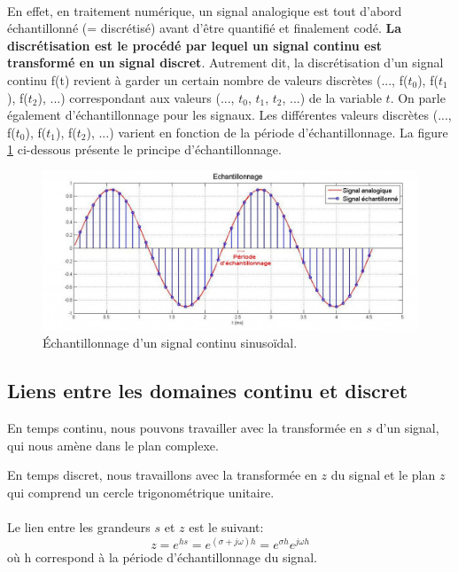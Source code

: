 \paragraph{}
En effet, en traitement numérique, un signal analogique est tout d'abord échantillonné (= discrétisé) avant d'être quantifié et finalement codé. \textbf{La discrétisation est le procédé par lequel un signal continu est transformé en un signal discret}. Autrement dit, la discrétisation d'un signal continu f(t) revient à garder un certain nombre de valeurs discrètes (..., f($t_{0}$), f($t_{1}$), f($t_{2}$), ...) correspondant aux valeurs (..., $t_{0}$, $t_{1}$, $t_{2}$, ...) de la variable $t$. On parle également d'échantillonnage pour les signaux. Les différentes valeurs discrètes (..., f($t_{0}$), f($t_{1}$), f($t_{2}$), ...) varient en fonction de la période d'échantillonnage. La figure \ref{échantillonnage} ci-dessous présente le principe d'échantillonnage.
\begin{figure}[!ht]
\centering
	\includegraphics[scale=0.45]{images/echantillonnage.jpg}
	\caption{Échantillonnage d'un signal continu sinusoïdal.}
	\label{échantillonnage}
\end{figure}

\newpage
\subsection{Liens entre les domaines continu et discret}

En temps continu, nous pouvons travailler avec la transformée en $s$ d'un signal, qui nous amène dans le plan complexe.

En temps discret, nous travaillons avec la transformée en $z$ du signal et le plan $z$ qui comprend un cercle trigonométrique unitaire.

\paragraph{}
Le lien entre les grandeurs $s$ et $z$ est le suivant:
\begin{equation}
z = e^{hs} = e^{(\sigma + j\omega)h} = e^{\sigma h}e^{j\omega h}
\end{equation}
où h correspond à la période d'échantillonnage du signal.
